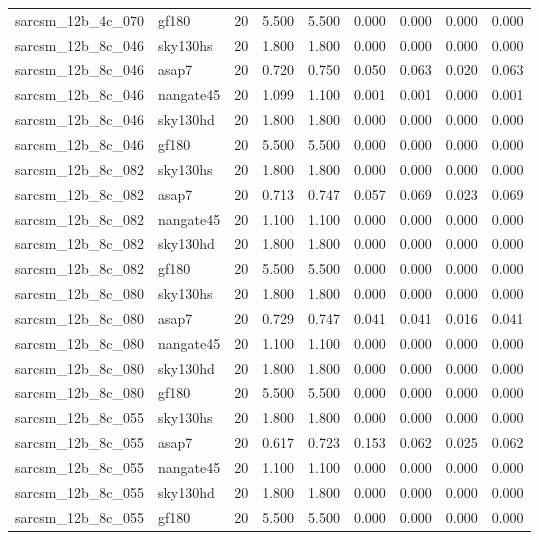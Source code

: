 \begin{tabular}{llrrrrrrr}
sarcsm\_12b\_4c\_070 & gf180 & 20 & 5.500 & 5.500 & 0.000 & 0.000 & 0.000 & 0.000 \\
sarcsm\_12b\_8c\_046 & sky130hs & 20 & 1.800 & 1.800 & 0.000 & 0.000 & 0.000 & 0.000 \\
sarcsm\_12b\_8c\_046 & asap7 & 20 & 0.720 & 0.750 & 0.050 & 0.063 & 0.020 & 0.063 \\
sarcsm\_12b\_8c\_046 & nangate45 & 20 & 1.099 & 1.100 & 0.001 & 0.001 & 0.000 & 0.001 \\
sarcsm\_12b\_8c\_046 & sky130hd & 20 & 1.800 & 1.800 & 0.000 & 0.000 & 0.000 & 0.000 \\
sarcsm\_12b\_8c\_046 & gf180 & 20 & 5.500 & 5.500 & 0.000 & 0.000 & 0.000 & 0.000 \\
sarcsm\_12b\_8c\_082 & sky130hs & 20 & 1.800 & 1.800 & 0.000 & 0.000 & 0.000 & 0.000 \\
sarcsm\_12b\_8c\_082 & asap7 & 20 & 0.713 & 0.747 & 0.057 & 0.069 & 0.023 & 0.069 \\
sarcsm\_12b\_8c\_082 & nangate45 & 20 & 1.100 & 1.100 & 0.000 & 0.000 & 0.000 & 0.000 \\
sarcsm\_12b\_8c\_082 & sky130hd & 20 & 1.800 & 1.800 & 0.000 & 0.000 & 0.000 & 0.000 \\
sarcsm\_12b\_8c\_082 & gf180 & 20 & 5.500 & 5.500 & 0.000 & 0.000 & 0.000 & 0.000 \\
sarcsm\_12b\_8c\_080 & sky130hs & 20 & 1.800 & 1.800 & 0.000 & 0.000 & 0.000 & 0.000 \\
sarcsm\_12b\_8c\_080 & asap7 & 20 & 0.729 & 0.747 & 0.041 & 0.041 & 0.016 & 0.041 \\
sarcsm\_12b\_8c\_080 & nangate45 & 20 & 1.100 & 1.100 & 0.000 & 0.000 & 0.000 & 0.000 \\
sarcsm\_12b\_8c\_080 & sky130hd & 20 & 1.800 & 1.800 & 0.000 & 0.000 & 0.000 & 0.000 \\
sarcsm\_12b\_8c\_080 & gf180 & 20 & 5.500 & 5.500 & 0.000 & 0.000 & 0.000 & 0.000 \\
sarcsm\_12b\_8c\_055 & sky130hs & 20 & 1.800 & 1.800 & 0.000 & 0.000 & 0.000 & 0.000 \\
sarcsm\_12b\_8c\_055 & asap7 & 20 & 0.617 & 0.723 & 0.153 & 0.062 & 0.025 & 0.062 \\
sarcsm\_12b\_8c\_055 & nangate45 & 20 & 1.100 & 1.100 & 0.000 & 0.000 & 0.000 & 0.000 \\
sarcsm\_12b\_8c\_055 & sky130hd & 20 & 1.800 & 1.800 & 0.000 & 0.000 & 0.000 & 0.000 \\
sarcsm\_12b\_8c\_055 & gf180 & 20 & 5.500 & 5.500 & 0.000 & 0.000 & 0.000 & 0.000 \\

\end{tabular}
